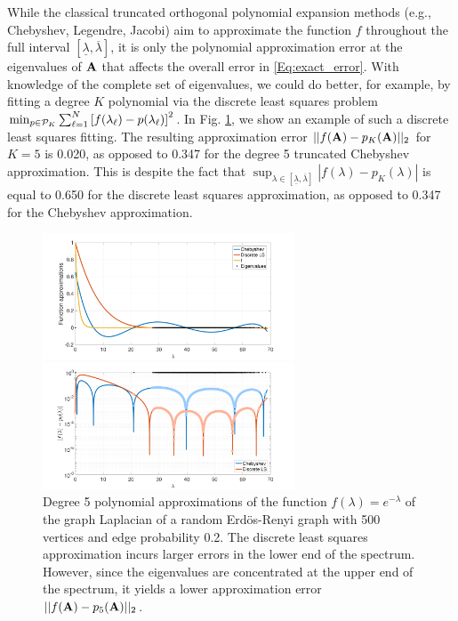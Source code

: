 \documentclass{article}
\begin{document}
While the classical truncated orthogonal polynomial expansion methods (e.g., Chebyshev, Legendre, Jacobi) aim to approximate the function $f$ throughout the full interval $[\underline{\lambda},\overline{\lambda}]$, it is only the polynomial approximation error at the eigenvalues of ${\bf A}$ that affects the overall error in \eqref{Eq:exact_error}. With knowledge of the complete set of eigenvalues, we could do better, for example, by fitting a degree $K$ polynomial via the discrete least squares problem $\min_{p \in {\cal P}_K} \sum_{\ell=1}^N \left[f(\lambda_{\ell})-p(\lambda_{\ell})\right]^2$. In Fig. \ref{Fig:dls}, we show an example of such a discrete least squares fitting. The resulting approximation error $||f({\bf A})-p_K({\bf A})||_2$ for $K=5$ is 0.020, as opposed to 0.347 for the degree 5 truncated Chebyshev approximation. This is despite the fact that $\sup_{\lambda \in [\underline{\lambda},\overline{\lambda}]}|f(\lambda)-p_K(\lambda)|$ is equal to 0.650 for the discrete least squares approximation, as opposed to 0.347 for the Chebyshev approximation.

\begin{figure}[t]
\centerline{\includegraphics[width=7.5cm]{fig_motivation1}}
\centerline{\includegraphics[width=7.5cm]{fig_motivation2}}
\caption{Degree 5 polynomial approximations of the function $f(\lambda)=e^{-\lambda}$ of the graph Laplacian of a random Erd\"{o}s-Renyi graph with 500 vertices and edge probability 0.2. The discrete least squares approximation incurs larger errors in the lower end of the spectrum. However, since the eigenvalues are concentrated at the upper end of the spectrum, it yields a lower approximation error $||f({\bf A})-p_5({\bf A})||_2$.}
\label{Fig:dls}
\end{figure}
\end{document}

